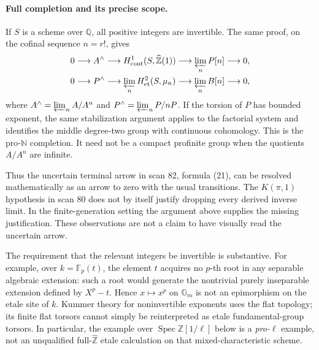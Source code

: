 \documentclass[11pt,a4paper]{article}
\theoremstyle{definition}
\begin{document}
\paragraph{Full completion and its precise scope.}
If \(S\) is a scheme over \(\mathbb Q\), all positive integers are
invertible.  The same proof, on the cofinal sequence \(n=r!\), gives
\begin{align*}
 0&\longrightarrow A^\wedge
 \longrightarrow H^1_{\mathrm{cont}}(S,\widehat{\mathbb Z}(1))
 \longrightarrow \varprojlim_n P[n]\longrightarrow 0,\\
 0&\longrightarrow P^\wedge
 \longrightarrow \varprojlim_n H^2_{\mathrm{et}}(S,\mu_n)
 \longrightarrow \varprojlim_n B[n]\longrightarrow 0,
\end{align*}
where \(A^\wedge=\varprojlim_n A/A^n\) and
\(P^\wedge=\varprojlim_n P/nP\).  If the torsion of \(P\) has bounded
exponent, the same stabilization argument applies to the factorial
system and identifies the middle degree-two group with continuous
cohomology.  This is the pro-\(\mathbb N\) completion.  It need not be
a compact profinite group when the quotients \(A/A^n\) are infinite.

Thus the uncertain terminal arrow in scan 82, formula (21), can be
resolved mathematically as an arrow to zero with the usual transitions.
The \(K(\pi,1)\) hypothesis in scan 80 does not by itself justify dropping
every derived inverse limit.  In the finite-generation setting the
argument above supplies the missing justification.  These observations
are not a claim to have visually read the uncertain arrow.

The requirement that the relevant integers be invertible is substantive.
For example, over \(k=\mathbb F_p(t)\), the element \(t\) acquires no
\(p\)-th root in any separable algebraic extension: such a root would
generate the nontrivial purely inseparable extension defined by
\(X^p-t\).  Hence \(x\mapsto x^p\) on \(\mathbb G_m\) is not an epimorphism
on the etale site of \(k\).  Kummer theory for noninvertible exponents
uses the flat topology; its finite flat torsors cannot simply be
reinterpreted as etale fundamental-group torsors.  In particular, the
example over \(\operatorname{Spec}\mathbb Z[1/\ell]\) below is a
\emph{pro-\(\ell\)} example, not an unqualified full-\(\widehat{\mathbb Z}\)
etale calculation on that mixed-characteristic scheme.
\end{document}
